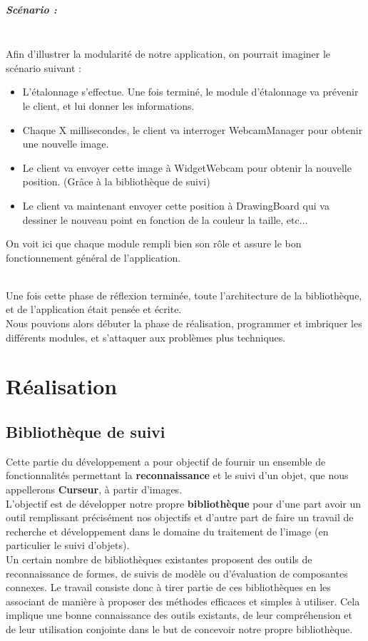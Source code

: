 \documentclass{report}
\begin{document}
				\paragraph{Scénario :} \ \\
				Afin d'illustrer la modularité de notre application, on pourrait imaginer le scénario suivant :
				\begin{itemize}
					\item L'étalonnage s'effectue. Une fois terminé, le module d'étalonnage va prévenir le client, et lui donner les informations.
					\item Chaque X millisecondes, le client va interroger WebcamManager pour obtenir une nouvelle image.
					\item Le client va envoyer cette image à WidgetWebcam pour obtenir la nouvelle position. (Grâce à la bibliothèque de suivi)
					\item Le client va maintenant envoyer cette position à DrawingBoard qui va dessiner le nouveau point en fonction de la couleur la taille, etc...
				\end{itemize}
				On voit ici que chaque module rempli bien son rôle et assure le bon fonctionnement général de l'application.
				
				$$$$ \\
				Une fois cette phase de réflexion terminée, toute l'architecture de la bibliothèque, et de l'application était pensée et écrite. \\
				Nous pouvions alors débuter la phase de réalisation, programmer et imbriquer les différents modules, et s'attaquer aux problèmes plus techniques.

				
	
	\chapter{Réalisation}
		\section{Bibliothèque de suivi}
			Cette partie du développement a pour objectif de fournir un ensemble de fonctionnalités permettant la \textbf{reconnaissance} et le suivi d'un objet, que nous appellerons \textbf{Curseur}, à partir d'images. \\
			L'objectif est de développer notre propre \textbf{bibliothèque} pour d'une part avoir un outil remplissant précisément nos objectifs et d'autre part de faire un travail de recherche et développement dans le domaine du traitement de l'image (en particulier le suivi d'objets). \\
			Un certain nombre de bibliothèques existantes proposent des outils de reconnaissance de formes, de suivis de modèle ou d'évaluation de composantes connexes. Le travail consiste donc à tirer partie de ces bibliothèques en les associant de manière à proposer des méthodes efficaces et simples à utiliser. Cela implique une bonne connaissance des outils existants, de leur compréhension et de leur utilisation conjointe dans le but de concevoir notre propre bibliothèque.
			\newpage
\end{document}
